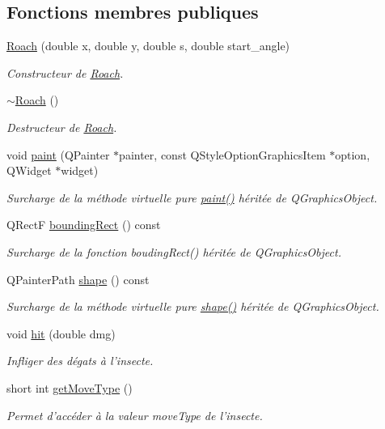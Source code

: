 \subsection*{Fonctions membres publiques}
\begin{DoxyCompactItemize}
\item 
\hyperlink{classRoach_af12999aec092cc5dc1afb0c3f85ee353}{Roach} (double x, double y, double s, double start\_\-angle)
\begin{DoxyCompactList}\small\item\em Constructeur de \hyperlink{classRoach}{Roach}. \end{DoxyCompactList}\item 
\hyperlink{classRoach_afc9000ffd6eb13d7280afbe0ef494f4f}{$\sim$Roach} ()
\begin{DoxyCompactList}\small\item\em Destructeur de \hyperlink{classRoach}{Roach}. \end{DoxyCompactList}\item 
void \hyperlink{classRoach_a13a922274476d77e17405cbe199ce691}{paint} (QPainter $\ast$painter, const QStyleOptionGraphicsItem $\ast$option, QWidget $\ast$widget)
\begin{DoxyCompactList}\small\item\em Surcharge de la méthode virtuelle pure \hyperlink{classRoach_a13a922274476d77e17405cbe199ce691}{paint()} héritée de QGraphicsObject. \end{DoxyCompactList}\item 
QRectF \hyperlink{classBug_a9b39c25361faad07b1bf2dd927d09dab}{boundingRect} () const 
\begin{DoxyCompactList}\small\item\em Surcharge de la fonction boudingRect() héritée de QGraphicsObject. \end{DoxyCompactList}\item 
QPainterPath \hyperlink{classBug_a587a36d3145c2b4dba6c689af22c65ac}{shape} () const 
\begin{DoxyCompactList}\small\item\em Surcharge de la méthode virtuelle pure \hyperlink{classBug_a587a36d3145c2b4dba6c689af22c65ac}{shape()} héritée de QGraphicsObject. \end{DoxyCompactList}\item 
void \hyperlink{classBug_a63402c05b5ba3fb034e41f1ced0e4b9f}{hit} (double dmg)
\begin{DoxyCompactList}\small\item\em Infliger des dégats à l'insecte. \end{DoxyCompactList}\item 
short int \hyperlink{classBug_aced471cedcfa855baddf4c827003e755}{getMoveType} ()
\begin{DoxyCompactList}\small\item\em Permet d'accéder à la valeur moveType de l'insecte. \end{DoxyCompactList}\end{DoxyCompactItemize}

